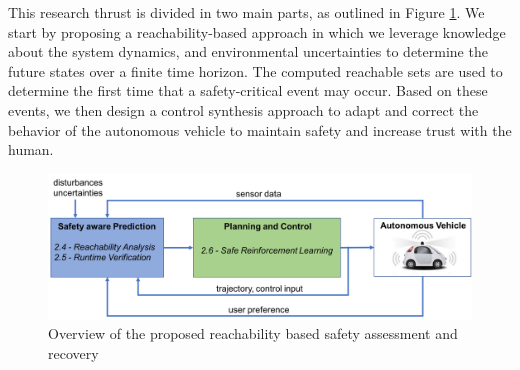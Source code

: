 This research thrust is divided in two main parts, as outlined in Figure \ref{fig:reach}. We start by proposing a reachability-based approach in which we leverage knowledge about the system dynamics, and environmental uncertainties to determine the future states over a finite time horizon. 
The computed reachable sets are used to determine the first time that a safety-critical event may occur. 
Based on these events, we then design a control synthesis approach to adapt and correct the behavior of the autonomous vehicle to maintain safety and increase trust with the human.

\begin{figure}
    \centering
    \includegraphics[width=0.8\columnwidth]{figures/reach.png}
    \caption{Overview of the proposed reachability based safety assessment and recovery}
    \label{fig:reach}
\end{figure}

%



